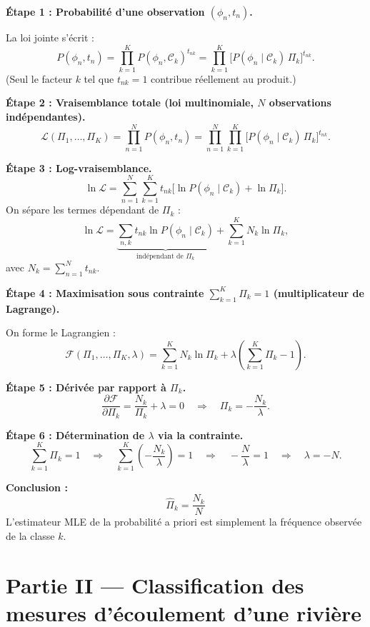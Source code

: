 \documentclass[12pt,a4paper]{article}
\begin{document}
\begin{solution}

\textbf{Étape 1 : Probabilité d'une observation $(\phi_n, t_n)$.}

La loi jointe s'écrit :
\[
  P(\phi_n, t_n)
  = \prod_{k=1}^{K} P(\phi_n, \mathcal{C}_k)^{t_{nk}}
  = \prod_{k=1}^{K} \bigl[P(\phi_n \mid \mathcal{C}_k)\,\Pi_k\bigr]^{t_{nk}}.
\]
(Seul le facteur $k$ tel que $t_{nk}=1$ contribue réellement au produit.)

\medskip
\textbf{Étape 2 : Vraisemblance totale (loi multinomiale, $N$ observations indépendantes).}
\[
  \mathcal{L}(\Pi_1,\ldots,\Pi_K)
  = \prod_{n=1}^{N} P(\phi_n, t_n)
  = \prod_{n=1}^{N}\prod_{k=1}^{K} \bigl[P(\phi_n \mid \mathcal{C}_k)\,\Pi_k\bigr]^{t_{nk}}.
\]

\medskip
\textbf{Étape 3 : Log-vraisemblance.}
\[
  \ln \mathcal{L}
  = \sum_{n=1}^{N}\sum_{k=1}^{K} t_{nk}
    \bigl[\ln P(\phi_n \mid \mathcal{C}_k) + \ln \Pi_k\bigr].
\]
On sépare les termes dépendant de $\Pi_k$ :
\[
  \ln \mathcal{L}
  = \underbrace{\sum_{n,k} t_{nk}\ln P(\phi_n \mid \mathcal{C}_k)}_{\text{indépendant de }\Pi_k}
  + \sum_{k=1}^{K} N_k \ln \Pi_k,
\]
avec $N_k = \sum_{n=1}^{N} t_{nk}$.

\medskip
\textbf{Étape 4 : Maximisation sous contrainte $\sum_{k=1}^{K}\Pi_k = 1$ (multiplicateur de Lagrange).}

On forme le Lagrangien :
\[
  \mathcal{F}(\Pi_1,\ldots,\Pi_K,\lambda)
  = \sum_{k=1}^{K} N_k \ln \Pi_k
    + \lambda\!\left(\sum_{k=1}^{K} \Pi_k - 1\right).
\]

\medskip
\textbf{Étape 5 : Dérivée par rapport à $\Pi_k$.}
\[
  \frac{\partial \mathcal{F}}{\partial \Pi_k}
  = \frac{N_k}{\Pi_k} + \lambda = 0
  \quad\Longrightarrow\quad
  \Pi_k = -\frac{N_k}{\lambda}.
\]

\medskip
\textbf{Étape 6 : Détermination de $\lambda$ via la contrainte.}
\[
  \sum_{k=1}^{K} \Pi_k = 1
  \quad\Rightarrow\quad
  \sum_{k=1}^{K} \left(-\frac{N_k}{\lambda}\right) = 1
  \quad\Rightarrow\quad
  -\frac{N}{\lambda} = 1
  \quad\Rightarrow\quad
  \lambda = -N.
\]

\medskip
\textbf{Conclusion :}
\[
  \boxed{\hat{\Pi}_k = \frac{N_k}{N}}
\]
L'estimateur MLE de la probabilité a priori est simplement la fréquence observée de la classe $k$.
\end{solution}

\section{Partie II — Classification des mesures d'écoulement d'une rivière}
\end{document}

